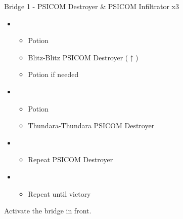 \begin{paracol}{2}
	\begin{battle}{Bridge 1 - PSICOM Destroyer \& PSICOM Infiltrator x3}
		\begin{itemize}
			\item \first
			      \begin{itemize}
				      \item Potion
				      \item Blitz-Blitz PSICOM Destroyer ($\uparrow$)
				      \item Potion if needed
			      \end{itemize}
			\item \second
			      \begin{itemize}
				      \item Potion
				      \item Thundara-Thundara PSICOM Destroyer
			      \end{itemize}
			\item \first
			      \begin{itemize}
				      \item Repeat PSICOM Destroyer
			      \end{itemize}
			\item \fifth
			      \begin{itemize}
				      \item Repeat until victory
			      \end{itemize}
		\end{itemize}
		  
	\end{battle}
	\switchcolumn
	\renewcommand{\first}{[1] Strike Team (\com/\syn/\com)}
	\renewcommand{\second}{[2] Tri-Disaster (\rav/\rav/\rav)}
	\renewcommand{\third}{[3] Strategic Warfare (\com/\syn/\sen)}
	\renewcommand{\fourth}{[4] Tri-Disaster (\rav/\rav/\rav)}
	\renewcommand{\fifth}{[5] Cerberus (\com/\com/\com)}
	\renewcommand{\sixth}{[6] Cerberus (\com/\com/\com)}
	Activate the bridge in front.


\end{paracol}
